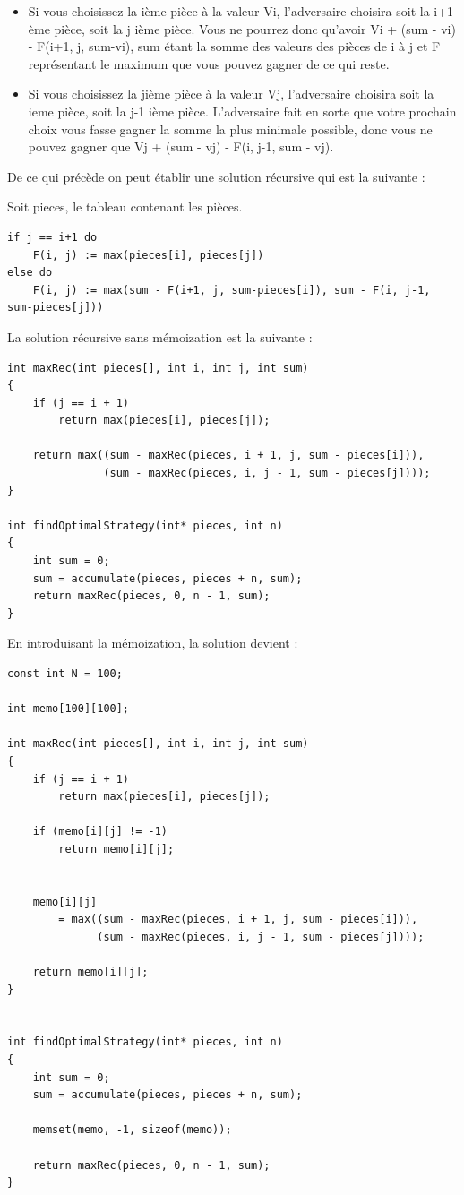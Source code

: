 \documentclass[a4paper]{article}
\begin{document}
\begin{itemize}
\item Si vous choisissez la ième pièce à la valeur Vi, l'adversaire choisira soit la i+1 ème pièce, soit la j ième pièce. Vous ne pourrez donc qu'avoir Vi + (sum - vi) - F(i+1, j, sum-vi), sum étant la somme des valeurs des pièces de i à j et F représentant le maximum que vous pouvez gagner de ce qui reste.
\item Si vous choisissez la jième pièce à la valeur Vj, l'adversaire choisira soit la ieme pièce, soit la j-1 ième pièce. L'adversaire fait en sorte que votre prochain choix vous fasse gagner la somme la plus minimale possible, donc vous ne pouvez gagner que Vj + (sum - vj) - F(i, j-1, sum - vj).
\end{itemize}

De ce qui précède on peut établir une solution récursive qui est la suivante :

Soit pieces, le tableau contenant les pièces.

\begin{verbatim}
if j == i+1 do
    F(i, j) := max(pieces[i], pieces[j])
else do
    F(i, j) := max(sum - F(i+1, j, sum-pieces[i]), sum - F(i, j-1, sum-pieces[j]))
\end{verbatim}


La solution récursive sans mémoization est la suivante :

\begin{verbatim}
int maxRec(int pieces[], int i, int j, int sum)
{
    if (j == i + 1)
        return max(pieces[i], pieces[j]);

    return max((sum - maxRec(pieces, i + 1, j, sum - pieces[i])),
               (sum - maxRec(pieces, i, j - 1, sum - pieces[j])));
}

int findOptimalStrategy(int* pieces, int n)
{
    int sum = 0;
    sum = accumulate(pieces, pieces + n, sum);
    return maxRec(pieces, 0, n - 1, sum);
}
\end{verbatim}


En introduisant la mémoization, la solution devient :

\begin{verbatim}
const int N = 100;

int memo[100][100];

int maxRec(int pieces[], int i, int j, int sum)
{
    if (j == i + 1)
        return max(pieces[i], pieces[j]);

    if (memo[i][j] != -1)
        return memo[i][j];


    memo[i][j]
        = max((sum - maxRec(pieces, i + 1, j, sum - pieces[i])),
              (sum - maxRec(pieces, i, j - 1, sum - pieces[j])));

    return memo[i][j];
}


int findOptimalStrategy(int* pieces, int n)
{
    int sum = 0;
    sum = accumulate(pieces, pieces + n, sum);

    memset(memo, -1, sizeof(memo));

    return maxRec(pieces, 0, n - 1, sum);
}
\end{verbatim}
\end{document}
